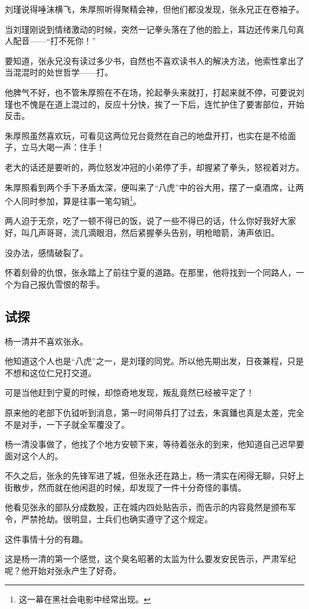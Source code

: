 \begin{multicols}{\theparacolNo}
		刘瑾说得唾沫横飞，朱厚照听得聚精会神，但他们都没发现，张永兄正在卷袖子。

		当刘瑾刚说到情绪激动的时候，突然一记拳头落在了他的脸上，耳边还传来几句真人配音——“打不死你！”

		要知道，张永兄没有读过多少书，自然也不喜欢读书人的解决方法，他索性拿出了当混混时的处世哲学——打。

		他脾气不好，也不管朱厚照在不在场，抡起拳头来就打，打起来就不停，可要说刘瑾也不愧是在道上混过的，反应十分快，挨了一下后，连忙护住了要害部位，开始反击。

		朱厚照虽然喜欢玩，可看见这两位兄台竟然在自己的地盘开打，也实在是不给面子，立马大喝一声：住手！

		老大的话还是要听的，两位怒发冲冠的小弟停了手，却握紧了拳头，怒视着对方。

		朱厚照看到两个手下矛盾太深，便叫来了“八虎”中的谷大用，摆了一桌酒席，让两个人同时参加，算是往事一笔勾销\footnote{这一幕在黑社会电影中经常出现。}。

		两人迫于无奈，吃了一顿不得已的饭，说了一些不得已的话，什么你好我好大家好，叫几声哥哥，流几滴眼泪，然后紧握拳头告别，明枪暗箭，涛声依旧。

		没办法，感情破裂了。

		怀着刻骨的仇恨，张永踏上了前往宁夏的道路。在那里，他将找到一个同路人，一个为自己报仇雪恨的帮手。

		\subsection{试探}
		杨一清并不喜欢张永。

		他知道这个人也是“八虎”之一，是刘瑾的同党。所以他先期出发，日夜兼程，只是不想和这位仁兄打交道。

		可是当他赶到宁夏的时候，却惊奇地发现，叛乱竟然已经被平定了！

		原来他的老部下仇钺听到消息，第一时间带兵打了过去，朱寘鐇也真是太差，完全不是对手，一下子就全军覆没了。

		杨一清没事做了，他找了个地方安顿下来，等待着张永的到来，他知道自己迟早要面对这个人的。

		不久之后，张永的先锋军进了城，但张永还在路上，杨一清实在闲得无聊，只好上街散步，然而就在他闲逛的时候，却发现了一件十分奇怪的事情。

		他看见张永的部队分成数股，正在城内四处贴告示，而告示的内容竟然是颁布军令，严禁抢劫。很明显，士兵们也确实遵守了这个规定。

		这件事情十分的有趣。

		这是杨一清的第一个感觉，这个臭名昭著的太监为什么要发安民告示，严肃军纪呢？他开始对张永产生了好奇。


\end{multicols}
